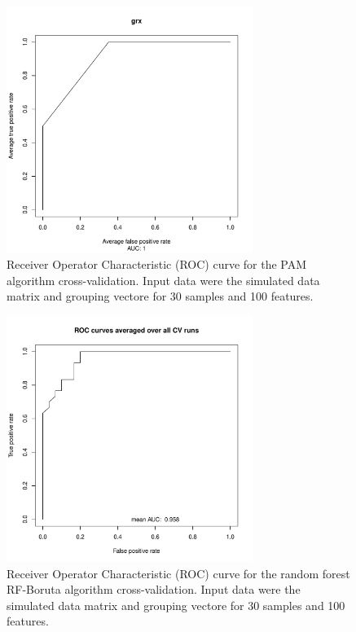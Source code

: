 \documentclass[11pt,a4paper]{article}
\begin{document}
\begin{figure}[htp]
\centering
\includegraphics[width=8cm,height=8cm]{rocpam}
\caption{Receiver Operator Characteristic (ROC) curve for the PAM algorithm cross-validation. Input data were the simulated data matrix and grouping vectore for 30 samples and 100 features.}
\label{fig:rocpam}
\end{figure}

\begin{figure}[htp]
\centering
\includegraphics[width=8cm,height=8cm]{rocrf}
\caption{Receiver Operator Characteristic (ROC) curve for the random forest RF-Boruta algorithm cross-validation. Input data were the simulated data matrix and grouping vectore for 30 samples and 100 features.}
\label{fig:rocrf}
\end{figure}
\end{document}
